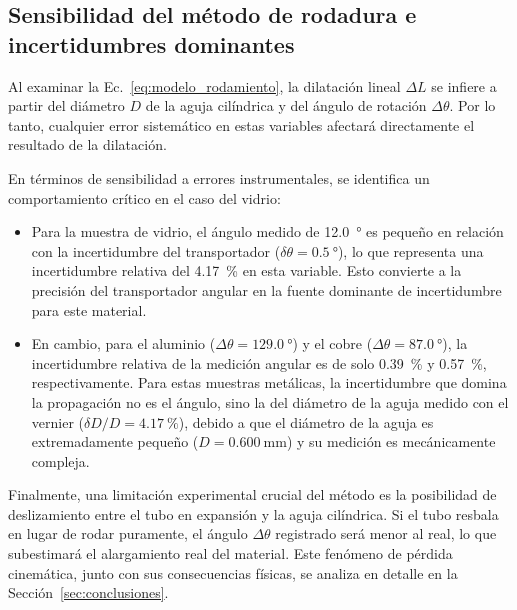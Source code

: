 \subsection{Sensibilidad del método de rodadura e incertidumbres dominantes}

Al examinar la Ec.~\eqref{eq:modelo_rodamiento}, la dilatación lineal $\Delta L$ se infiere a partir del diámetro $D$ de la aguja cilíndrica y del ángulo de rotación $\Delta\theta$. Por lo tanto, cualquier error sistemático en estas variables afectará directamente el resultado de la dilatación. 

En términos de sensibilidad a errores instrumentales, se identifica un comportamiento crítico en el caso del vidrio:
\begin{itemize}
    \item Para la muestra de vidrio, el ángulo medido de \qty{12,0}{\degree} es pequeño en relación con la incertidumbre del transportador ($\delta\theta = \qty{0,5}{\degree}$), lo que representa una incertidumbre relativa del \qty{4,17}{\percent} en esta variable. Esto convierte a la precisión del transportador angular en la fuente dominante de incertidumbre para este material.
    \item En cambio, para el aluminio ($\Delta\theta = \qty{129,0}{\degree}$) y el cobre ($\Delta\theta = \qty{87,0}{\degree}$), la incertidumbre relativa de la medición angular es de solo \qty{0,39}{\percent} y \qty{0,57}{\percent}, respectivamente. Para estas muestras metálicas, la incertidumbre que domina la propagación no es el ángulo, sino la del diámetro de la aguja medido con el vernier ($\delta D / D = \qty{4,17}{\percent}$), debido a que el diámetro de la aguja es extremadamente pequeño ($D = \qty{0,600}{\milli\meter}$) y su medición es mecánicamente compleja.
\end{itemize}

Finalmente, una limitación experimental crucial del método es la posibilidad de deslizamiento entre el tubo en expansión y la aguja cilíndrica. Si el tubo resbala en lugar de rodar puramente, el ángulo $\Delta\theta$ registrado será menor al real, lo que subestimará el alargamiento real del material. Este fenómeno de pérdida cinemática, junto con sus consecuencias físicas, se analiza en detalle en la Sección~\ref{sec:conclusiones}.
